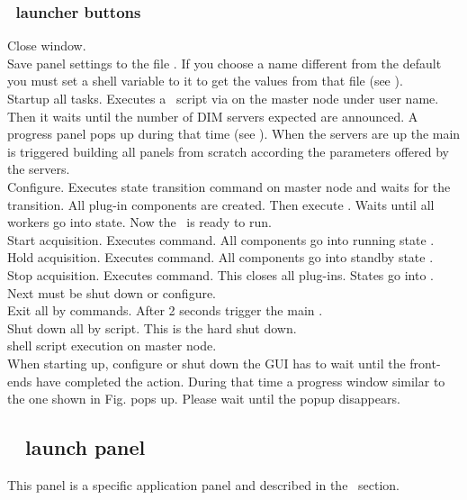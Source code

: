 {\subsubsection{\dabc\ launcher buttons}
 Close window.\\
 Save panel settings to the file .
If you choose a name different from the default you must
set a shell variable to it to get the values from that file
(see ).\\
 Startup all tasks. Executes a \dabc\ script  via  
on the master node under user name. Then it waits until the number of DIM servers
expected are announced. A progress panel pops up during that time
(see ).
When the servers are up the main  is triggered building
all panels from scratch according the parameters offered by the servers.\\
 Configure. Executes state transition command 
on master node and waits for the transition.
All plug-in components are created. Then execute .
Waits until all workers go into  state. Now the \dabc\ is ready to run.\\
 Start acquisition. Executes  command.
All components go into running state .\\
 Hold acquisition. Executes  command.
All components go into standby state .\\
 Stop acquisition. Executes  command.
This closes all plug-ins. States go into . Next must be
shut down or configure.\\
 Exit all by  commands. After 2 seconds 
trigger the main .\\
 Shut down all by script. This is the hard shut down.\\
  shell script execution on master node.\\
When starting up, configure or shut down the GUI has to wait
until the front-ends have completed the action.
During that time a progress window similar to the one shown
in Fig.  pops up.
Please wait until the popup disappears.
\subsection{\mbs~ launch panel}
This panel is a specific application panel and described in the \mbs\ section.
}
